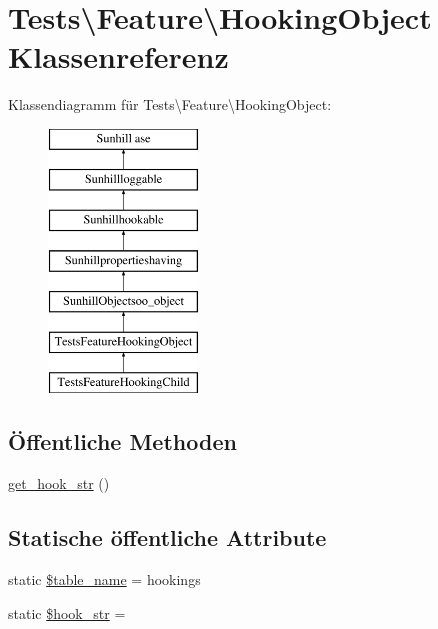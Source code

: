 \hypertarget{classTests_1_1Feature_1_1HookingObject}{}\section{Tests\textbackslash{}Feature\textbackslash{}Hooking\+Object Klassenreferenz}
\label{classTests_1_1Feature_1_1HookingObject}
Klassendiagramm für Tests\textbackslash{}Feature\textbackslash{}Hooking\+Object\+:\begin{figure}[H]
\begin{center}
\leavevmode
\includegraphics[height=7.000000cm]{d8/dd7/classTests_1_1Feature_1_1HookingObject}
\end{center}
\end{figure}
\subsection*{Öffentliche Methoden}
\begin{DoxyCompactItemize}
\item 
\hyperlink{classTests_1_1Feature_1_1HookingObject_aa9ba1fdc8daa2c1ef90b4de1b2863f0b}{get\+\_\+hook\+\_\+str} ()
\end{DoxyCompactItemize}
\subsection*{Statische öffentliche Attribute}
\begin{DoxyCompactItemize}
\item 
static \hyperlink{classTests_1_1Feature_1_1HookingObject_aeed4b4744b4d4ef5a5843310b975cbde}{\$table\+\_\+name} = \textquotesingle{}hookings\textquotesingle{}
\item 
static \hyperlink{classTests_1_1Feature_1_1HookingObject_a848062be4db079dc13917d90a8656b13}{\$hook\+\_\+str} = \textquotesingle{}\textquotesingle{}
\end{DoxyCompactItemize}
